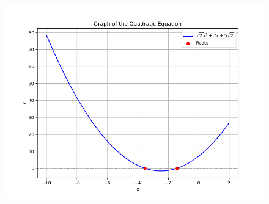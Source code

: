 \documentclass[journal]{IEEEtran}
\numberwithin{equation}{enumi}
\numberwithin{figure}{enumi}
\begin{document}
\begin{enumerate}
\begin{enumerate}
\end{enumerate}


\begin{figure}[h!]
   \centering
   \includegraphics[width=0.7\linewidth]{figs/Figure_2.png}
\end{figure}
\end{enumerate}
\end{document}
